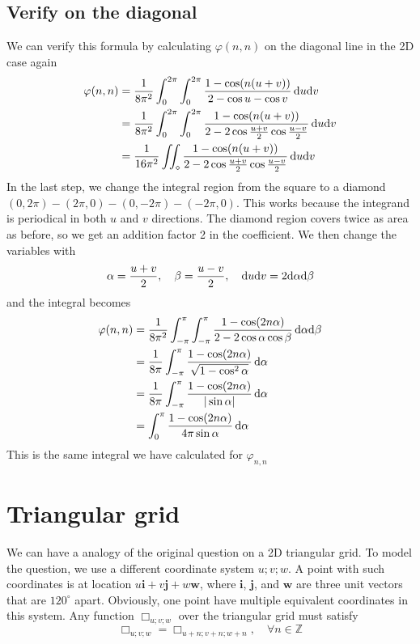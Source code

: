 \documentclass[10pt,a4paper,draft]{article}
\begin{document}
\subsection{Verify on the diagonal}
We can verify this formula by calculating $\varphi(n,n)$ on the diagonal line in the 2D case again
\begin{align*}
\varphi(n,n) &= \frac{1}{8\pi^2}\int_0^{2\pi}\int_0^{2\pi}\frac{1-\cos (n(u+v))}{2-\cos u - \cos v}\,\mathrm{d} u \mathrm{d} v\\
&=  \frac{1}{8\pi^2}\int_0^{2\pi}\int_0^{2\pi}\frac{1-\cos (n(u+v))}{2-2\cos\frac{u+v}{2}\cos\frac{u-v}{2}}\,\mathrm{d} u \mathrm{d} v\\
&=  \frac{1}{16\pi^2}\iint_\diamond\frac{1-\cos (n(u+v))}{2-2\cos\frac{u+v}{2}\cos\frac{u-v}{2}}\,\mathrm{d} u \mathrm{d} v
\end{align*}
In the last step, we change the integral region from the square to a diamond $(0, 2\pi) - (2\pi, 0) - (0, -2\pi) - (-2\pi, 0)$. This works because the integrand is periodical in both $u$ and $v$ directions. The diamond region covers twice as area as before, so we get an addition factor 2 in the coefficient. We then change the variables with
\begin{align*}
\alpha = \frac{u+v}{2}, \quad\beta = \frac{u-v}{2}, \quad \mathrm{d} u\mathrm{d} v = 2\mathrm{d} \alpha \mathrm{d} \beta
\end{align*}
and the integral becomes
\begin{align*}
\varphi(n,n) &= \frac{1}{8\pi^2}\int_{-\pi}^{\pi}\int_{-\pi}^{\pi} \frac{1-\cos (2n\alpha)}{2-2\cos\alpha\cos\beta}\,\mathrm{d} \alpha \mathrm{d} \beta\\
&= \frac{1}{8\pi}\int_{-\pi}^{\pi} \frac{1-\cos (2n\alpha)}{\sqrt{1-\cos^2\alpha}}\,\mathrm{d} \alpha \\
&= \frac{1}{8\pi}\int_{-\pi}^{\pi} \frac{1-\cos (2n\alpha)}{|\sin\alpha|}\,\mathrm{d} \alpha \\
&= \int_0^{\pi} \frac{1-\cos (2n\alpha)}{4\pi\sin\alpha}\,\mathrm{d} \alpha 
\end{align*}
This is the same integral we have calculated for $\varphi_{n,n}$

\section{Triangular grid}

We can have a analogy of the original question on a 2D triangular grid. To model the question, we use a different coordinate system $u;v;w$. A point with such coordinates is at location $u\mathbf{i}+v\mathbf{j}+w\mathbf{w}$, where $\mathbf{i}$, $\mathbf{j}$, and $\mathbf{w}$ are three unit vectors that are $120^{\circ}$ apart. Obviously, one point have multiple equivalent coordinates in this system. Any function $\Box_{u;v;w}$ over the triangular grid must satisfy
\[
\Box_{u;v;w} = \Box_{u+n;v+n;w+n},\quad\forall n \in \mathbb{Z}
\]
\end{document}
